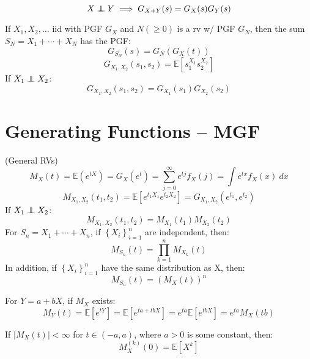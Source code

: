 \documentclass[twocolumn]{amsart}
\newcommand{\E}{\mathbb{E}}
\newcommand\independent{\protect\mathpalette{\protect\independenT}{\perp}}
\def\independenT#1#2{\mathrel{\rlap{$#1#2$}\mkern3mu{#1#2}}}
\begin{document}
\begin{equation*}
  X \independent Y \implies G_{X+Y}(s) = G_{X}(s)G_{Y}(s)
\end{equation*}

If $X_{1},X_{2},\ldots$ iid  with PGF $G_{X}$ and $N (\geq 0)$ is a rv w/ PGF
$G_{N}$, then the sum $S_{N} = X_{1}+\cdots+X_{N}$ has the PGF:
\begin{equation*}
  G_{S_{N}}(s) = G_{N}(G_{X}(t))
\end{equation*}
\begin{equation*}
  G_{X_{1},X_{2}}(s_{1},s_{2}) = \E[s_{1}^{X_{1}}s_{2}^{X_{2}}]
\end{equation*}
If $X_{1} \independent X_{2}$:
\begin{equation*}
  G_{X_{1},X_{2}}(s_{1},s_{2}) = G_{X_{1}}(s_{1})G_{X_{2}}(s_{2})
\end{equation*}


\section{Generating Functions -- MGF}
(General RVs)
\begin{equation*}
  M_{X}(t) = \E(e^{tX}) = G_{X}(e^{t}) = \sum_{j=0}^{\infty}e^{tj}f_{X}(j) =
  \int e^{tx}f_{X}(x)~dx
\end{equation*}
\begin{equation*}
  M_{X_{1},X_{2}}(t_{1},t_{2}) = \E[e^{t_{1}X_{1}}e^{t_{2}X_{2}}] = G_{X_{1},X_{2}}(e^{t_{1}},e^{t_{2}})
\end{equation*}
If $X_{1} \independent X_{2}$:
\begin{equation*}
  M_{X_{1},X_{2}}(t_{1},t_{2}) = M_{X_{1}}(t_{1})M_{X_{2}}(t_{2})
\end{equation*}
For $S_{n} = X_{1}+\cdots+X_{n}$, if $\left\{X_{i}\right\}^{n}_{i=1}$ are
independent, then:
\begin{equation*}
  M_{S_{n}}(t) = \prod_{k=1}^{n}M_{X_{k}}(t)
\end{equation*}
In addition, if $\left\{X_{i}\right\}^{n}_{i=1}$ have the same distribution as
X, then:
\begin{equation*}
  M_{S_{n}}(t) = (M_{X}(t))^{n}
\end{equation*}

For $Y=a+bX$, if $M_{X}$ exists:
\begin{equation*}
  M_{Y}(t) = \E[e^{tY}] = \E[e^{ta+tbX}] = e^{ta}\E[e^{tbX}] = e^{ta}M_{X}(tb)
\end{equation*}

If $|M_{X}(t)| < \infty$ for $t \in (-a,a)$, where $a>0$ is some constant, then:
\begin{equation*}
  M_{X}^{(k)}(0) = \E[X^{k}]
\end{equation*}
\end{document}
